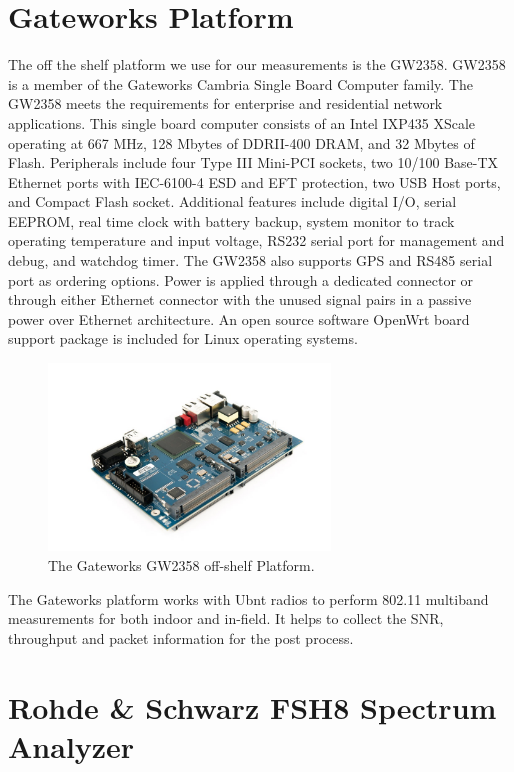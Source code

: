 \section{Gateworks Platform}

The off the shelf platform we use for our measurements is the GW2358. GW2358 is a member 
of the Gateworks Cambria Single Board Computer family. The GW2358 meets the requirements 
for enterprise and residential network applications. This single board computer consists 
of an Intel IXP435 XScale operating at 667 MHz, 128 Mbytes of DDRII-400 DRAM, and 32 Mbytes 
of Flash. Peripherals include four Type III Mini-PCI sockets, two 10/100 Base-TX Ethernet 
ports with IEC-6100-4 ESD and EFT protection, two USB Host ports, and Compact Flash socket. 
Additional features include digital I/O, serial EEPROM, real time clock with battery backup, 
system monitor to track operating temperature and input voltage, RS232 serial port for 
management and debug, and watchdog timer. The GW2358 also supports GPS and RS485 serial 
port as ordering options. Power is applied through a dedicated connector or through either 
Ethernet connector with the unused signal pairs in a passive power over Ethernet architecture. 
An open source software OpenWrt board support package is included for Linux operating systems.


\begin{figure} 
\centering
\includegraphics[width=75mm]{figures/gw2358}
\vspace{-0.1in}
\caption{The Gateworks GW2358 off-shelf Platform.}
\label{fig:gw2358}
\vspace{0.1in}
\end{figure}

The Gateworks platform works with Ubnt radios to perform 802.11 multiband measurements for 
both indoor and in-field. It helps to collect the SNR, throughput and packet information 
for the post process. 

\section{Rohde \& Schwarz FSH8 Spectrum Analyzer}

